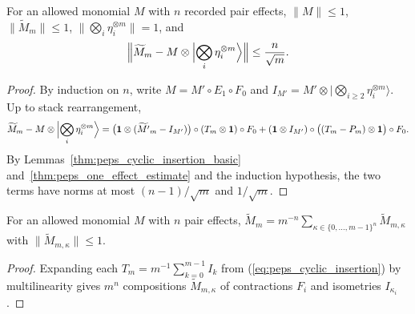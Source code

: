 \begin{lemma}
    \label{thm:peps_replaced_monomial_error}
    \leanok
    For an allowed monomial $M$ with $n$ recorded pair effects, $\|M\|\le 1$,
    $\|\widetilde M_m\|\le 1$, $\|\bigotimes_i\eta_i^{\otimes m}\|=1$, and
    \begin{align}
        \Bigl\|\widetilde M_m-M\otimes\Bigl|\bigotimes_i\eta_i^{\otimes m}\Bigr\rangle\Bigr\|
        \le\frac n{\sqrt m}.
        \label{eq:peps_replaced_monomial_error}
    \end{align}
\end{lemma}

\begin{proof}\leanok
    By induction on $n$, write $M=M'\circ E_1\circ F_0$ and
    $I_{M'}=M'\otimes|\bigotimes_{i\ge2}\eta_i^{\otimes m}\rangle$. Up to stack
    rearrangement,
    \begin{align}
        \widetilde M_m-M\otimes\Bigl|\bigotimes_i\eta_i^{\otimes m}\Bigr\rangle
        =\bigl(\mathbf 1\otimes(\widetilde{M'}_m-I_{M'})\bigr)\circ(T_m\otimes\mathbf 1)\circ F_0
        +(\mathbf 1\otimes I_{M'})\circ\bigl((T_m-P_m)\otimes\mathbf 1\bigr)\circ F_0.\notag
    \end{align}
    By Lemmas~\ref{thm:peps_cyclic_insertion_basic}
    and~\ref{thm:peps_one_effect_estimate} and the induction hypothesis, the
    two terms have norms at most $(n-1)/\sqrt m$ and $1/\sqrt m$.
\end{proof}

\begin{lemma}
    \label{thm:peps_replaced_monomial_expansion}
    \leanok
    For an allowed monomial $M$ with $n$ pair effects,
    $\widetilde M_m=m^{-n}\sum_{\kappa\in\{0,\dots,m-1\}^n}\widetilde M_{m,\kappa}$
    with $\|\widetilde M_{m,\kappa}\|\le 1$.
\end{lemma}

\begin{proof}\leanok
    Expanding each $T_m=m^{-1}\sum_{k=0}^{m-1}I_k$ from (\ref{eq:peps_cyclic_insertion})
    by multilinearity gives $m^n$ compositions $\widetilde M_{m,\kappa}$ of
    contractions $F_i$ and isometries $I_{\kappa_i}$.
\end{proof}

